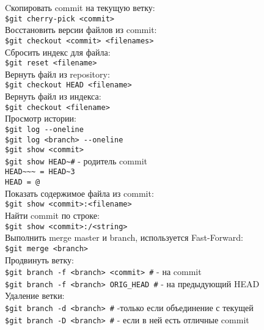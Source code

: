 \documentclass[12pt, a4paper]{article}
\begin{document}
\noindent Cкопировать commit на текущую ветку: \\
\indent \texttt{\$git cherry-pick <commit>}   \\

\noindent Восстановить версии файлов из commit:\\
\indent \texttt{\$git checkout <commit> <filenames>} \\
Сбросить индекс для файла: \\
\indent \texttt{\$git reset <filename>} \\
Вернуть файл из repository: \\
\indent \texttt{\$git checkout HEAD <filename>}  \\
Вернуть файл из индекса: \\
\indent \texttt{\$git checkout <filename>}  \\

\noindent Просмотр истории: \\
\indent \texttt{\$git log {-}-oneline} \\
\indent \texttt{\$git log <branch> {-}-oneline} \\
\indent \texttt{\$git show <commit>} \\
\indent \texttt{\$git show HEAD\~  \indent \#} - родитель commit \\
\indent \indent \texttt{HEAD\~{}\~{}\~{} = HEAD\~{}3}  \\
\indent \indent \texttt{HEAD = @}  \\

\noindent Показать содержимое файла из commit: \\
\indent \texttt{\$git show <commit>:<filename>} \\
\noindent Найти commit по строке: \\
\indent \texttt{\$git show <commit>:/<string>} \\

\noindent Выполнить merge master и branch, используется Fast-Forward: \\
\indent \texttt{\$git merge <branch>} \\

\noindent Продвинуть ветку: \\
\indent \texttt{\$git branch -f <branch> <commit> \indent \#} - на commit   \\
\indent \texttt{\$git branch -f <branch> ORIG\_HEAD \indent \#} - на предыдующий HEAD  \\

\noindent Удаление ветки: \\
\indent \texttt{\$git branch -d <branch> \indent \#} -только если объединение с текущей \\
\indent \texttt{\$git branch -D <branch> \indent \#} - если в ней есть отличные commit \\
\end{document}
